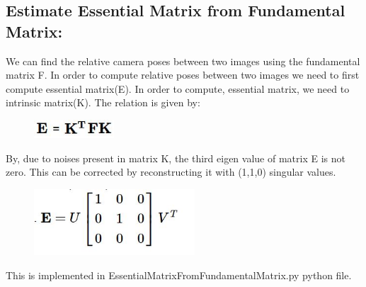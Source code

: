 \documentclass[12pt]{article}
\begin{document}
\subsection{Estimate Essential Matrix from Fundamental Matrix:}
We can find the relative camera poses between two images using the fundamental matrix F. In order to compute relative poses between two images we need to first compute essential matrix(E). In order to compute, essential matrix, we need to intrinsic matrix(K). The relation is given by:
\begin{figure}[h]
    \centering
    \includegraphics[width=3cm]{EM}
\end{figure}
\newline
By, due to noises present in matrix K, the third eigen value of matrix E is not zero. This can be corrected by reconstructing it with (1,1,0) singular values.
\newpage
\begin{figure}[h]
    \centering
    \includegraphics[width=6cm]{EM2}
\end{figure}
This is implemented in EssentialMatrixFromFundamentalMatrix.py python file.
\end{document}

